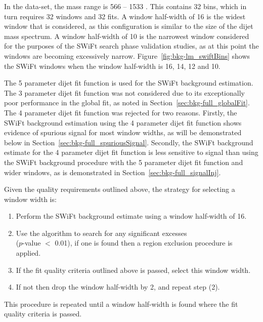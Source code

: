 
In the \lm{} data-set, the mass range is 566 -- 1533 \GeV{}. This contains 32 bins, which in turn requires 32 windows and 32 fits.
A window half-width of 16 is  the widest window that is considered,
as this configuration is similar to the size of the dijet mass spectrum.
A window half-width of 10 is the narrowest window considered for the purposes of the SWiFt search phase validation studies,
as at this point the windows are becoming excessively narrow.
Figure~\ref{fig:bkg-lm_swiftBins} shows the SWiFt windows when the window half-width is 16, 14, 12 and 10.

The 5 parameter dijet fit function is used for the SWiFt background estimation.
The 3 parameter dijet fit function was not considered due to its exceptionally poor performance in the global fit, as noted in Section~\ref{sec:bkg-full_globalFit}.
The 4 parameter dijet fit function was rejected for two reasons.
Firstly, the SWiFt background estimation using the 4 parameter dijet fit function shows evidence of spurious signal for most window widths,
as will be demonstrated below in Section~\ref{sec:bkg-full_spuriousSignal}.
Secondly, the SWiFt background estimate for the 4 parameter dijet fit function is less sensitive to signal than
using the SWiFt background procedure with the 5 parameter dijet fit function and wider windows, as is demonstrated in Section~\ref{sec:bkg-full_signalInj}.

\noindent
Given the quality requirements outlined above, the strategy for selecting a window width is:
\begin{enumerate}
\item Perform the SWiFt background estimate using a window half-width of 16.
\item Use the \bh{} algorithm to search for any significant excesses\\
  (\mbox{$p$-value} $<$ 0.01),  if one is found then a region exclusion procedure is applied.
\item If the fit quality criteria outlined above is passed, select this window width.
\item If not then drop the window half-width by 2, and repeat step (2).
\end{enumerate}
This procedure is repeated until a window half-width is found where the fit quality criteria is passed.

